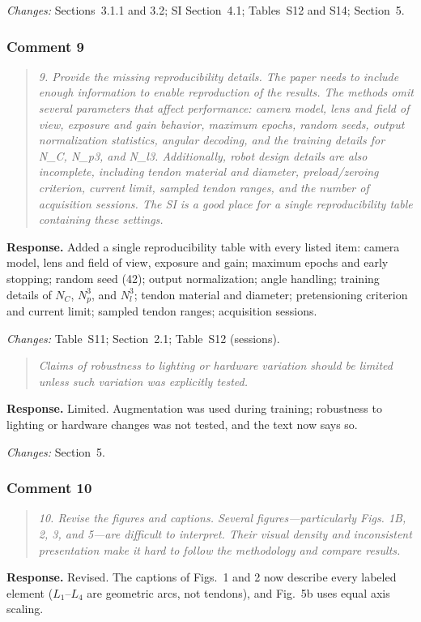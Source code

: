 \documentclass[11pt,a4paper]{article}
\newcommand{\rc}[1]{\begin{quote}\color{black!70}\itshape #1\end{quote}}
\begin{document}
\textit{Changes:} Sections~3.1.1 and 3.2; SI Section~4.1; Tables~S12 and S14; Section~5.

\subsubsection*{Comment 9}

\rc{9. Provide the missing reproducibility details. The paper needs to include enough information to enable reproduction of the results. The methods omit several parameters that affect performance: camera model, lens and field of view, exposure and gain behavior, maximum epochs, random seeds, output normalization statistics, angular decoding, and the training details for N\_C, N\_p3, and N\_l3. Additionally, robot design details are also incomplete, including tendon material and diameter, preload/zeroing criterion, current limit, sampled tendon ranges, and the number of acquisition sessions. The SI is a good place for a single reproducibility table containing these settings.}
\textbf{Response.} Added a single reproducibility table with every listed item: camera model, lens and field of view, exposure and gain; maximum epochs and early stopping; random seed (42); output normalization; angle handling; training details of $N_C$, $N_p^3$, and $N_l^3$; tendon material and diameter; pretensioning criterion and current limit; sampled tendon ranges; acquisition sessions.

\textit{Changes:} Table~S11; Section~2.1; Table~S12 (sessions).

\rc{Claims of robustness to lighting or hardware variation should be limited unless such variation was explicitly tested.}
\textbf{Response.} Limited. Augmentation was used during training; robustness to lighting or hardware changes was not tested, and the text now says so.

\textit{Changes:} Section~5.

\subsubsection*{Comment 10}

\rc{10. Revise the figures and captions. Several figures---particularly Figs. 1B, 2, 3, and 5---are difficult to interpret. Their visual density and inconsistent presentation make it hard to follow the methodology and compare results.}
\textbf{Response.} Revised. The captions of Figs.~1 and 2 now describe every labeled element ($L_1$--$L_4$ are geometric arcs, not tendons), and Fig.~5b uses equal axis scaling.
\end{document}
